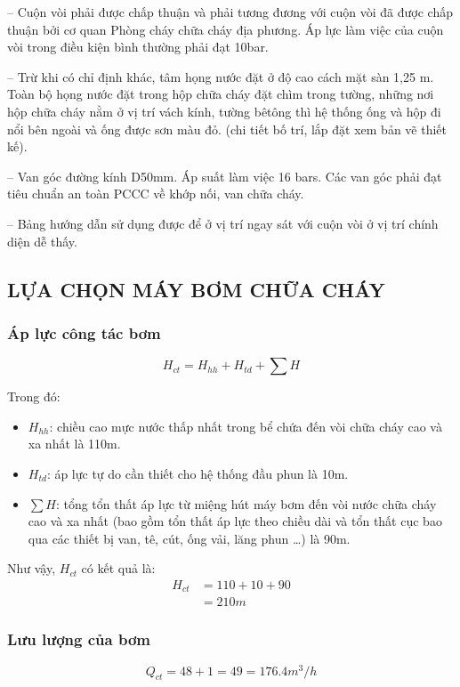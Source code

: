 -- Cuộn vòi phải được chấp thuận và phải tương đương với cuộn vòi đã được chấp thuận bởi cơ quan Phòng cháy chữa cháy địa phương. Áp lực làm việc của cuộn vòi trong điều kiện bình thường phải đạt 10bar.

-- Trừ khi có chỉ định khác, tâm họng nước đặt ở độ cao cách mặt sàn 1,25 m. Toàn bộ họng nước đặt trong hộp chữa cháy đặt chìm trong tường, những nơi hộp chữa cháy nằm ở vị trí vách kính, tường bêtông thì hệ thống ống và hộp đi nổi bên ngoài và ống được sơn màu đỏ. (chi tiết bố trí, lắp đặt xem bản vẽ thiết kế).

-- Van góc đường kính D50mm. Áp suất làm việc 16 bars. Các van góc phải đạt tiêu chuẩn an toàn PCCC về khớp nối, van chữa cháy.

-- Bảng hướng dẫn sử dụng được để ở vị trí ngay sát với cuộn vòi ở vị trí chính diện dễ thấy.

\subsection{LỰA CHỌN MÁY BƠM CHỮA CHÁY}
\subsubsection{Áp lực công tác bơm}
\begin{equation*}
	H_{ct} = H_{hh} + H_{td} + \sum H
\end{equation*}

Trong đó:
\begin{itemize}
	\item $H_{hh}$: chiều cao mực nước thấp nhất trong bể chứa đến vòi chữa cháy cao và xa nhất là 110m.
	\item $H_{td}$: áp lực tự do cần thiết cho hệ thống đầu phun là 10m.
	\item $\sum H$: tổng tổn thất áp lực từ miệng hút máy bơm đến vòi nước chữa cháy cao và xa nhất (bao gồm tổn thất áp lực theo chiều dài và tổn thất cục bao qua các thiết bị van, tê, cút, ống vải, lăng phun …) là 90m.
\end{itemize}

Như vậy, $H_{ct}$ có kết quả là:
\begin{equation*}
	\begin{split}
		H_{ct} &= 110 + 10 + 90\\ 
		&= 210 m
	\end{split}
\end{equation*}

\subsubsection{Lưu lượng của bơm}
\vspace{-0.5cm}
\begin{equation*}
	Q_{ct} = 48 + 1 = 49 = 176.4 m^3/h
\end{equation*}


